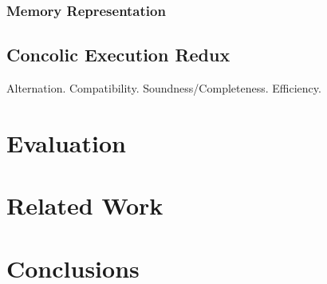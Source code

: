 \documentclass{llncs}
\begin{document}
\subsubsection{Memory Representation}

\subsection{Concolic Execution Redux}
\label{redux}

Alternation. Compatibility. Soundness/Completeness. Efficiency.

\section{Evaluation}

\section{Related Work}

\section{Conclusions}



\end{document}
